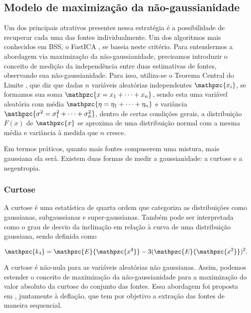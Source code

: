 \subsection{Modelo de maximização da não-gaussianidade}
    
    Um dos principais atrativos presentes nessa estratégia é a possibilidade de recuperar cada uma das fontes individualmente. Um dos algoritmos mais conhecidos em BSS, o FastICA \cite{fastica1}, se baseia neste critério. Para entendermos a abordagem via maximização da não-gaussianidade, precisamos introduzir o conceito de medição da independência entre duas estimativas de fontes, observando sua não-gaussianidade. Para isso, utiliza-se o Teorema Central do Limite \cite{cetrallimit}, que diz que dadas $n$ variáveis aleatórias independentes $\mathpzc{x_i}$, se formamos sua soma $\mathpzc{x = x_1 + \dots + x_n}$, sendo esta uma variável aleatória com média $\mathpzc{\eta = \eta_1 + \dots + \eta_n}$ e variância $\mathpzc{\sigma^2 = \sigma_1^2 + \dots + \sigma_n^2}$, dentro de certas condições gerais, a distribuição ${F(x)}$ de $\mathpzc{x}$  se aproxima de uma distribuição normal com a mesma média e variância à medida que ${n}$ cresce.
    
    \medskip
    
    Em termos práticos, quanto mais fontes compuserem uma mistura, mais gaussiana ela será. Existem duas formas de medir a gaussianidade: a curtose e a negentropia.

\subsubsection{Curtose}
    
    A curtose é uma estatística de quarta ordem que categoriza as distribuições como gaussianas, subgaussianas e super-gaussianas. Também pode ser interpretada como o grau de desvio da inclinação em relação à curva de uma distribuição gaussiana, sendo definida como
    
    \begin{equation}
        \mathpzc{k_4} = \mathpzc{E}\{\mathpzc{x^4}\} - 3(\mathpzc{E}\{\mathpzc{x^2}\})^2.
    \end{equation} 
    
    A curtose é não-nula para as variáveis aleatórias não gaussianas. Assim, podemos estender o conceito de maximização da não-gaussianidade para a maximização do valor absoluto da curtose do conjunto das fontes. Essa abordagem foi proposta em \cite{ML}, juntamente à deflação, que tem por objetivo a extração das fontes de maneira sequencial.
    
